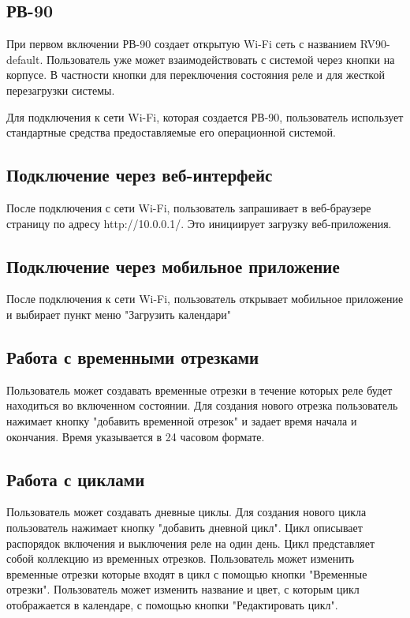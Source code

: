 \subsection{РВ-90}
При первом включении РВ-90 создает открытую Wi-Fi сеть  с названием RV90-default.
Пользователь уже может взаимодействовать с системой через кнопки на корпусе. В частности кнопки для переключения состояния реле и для жесткой перезагрузки системы.
 
Для подключения к сети Wi-Fi, которая создается РВ-90, пользователь использует стандартные средства предоставляемые его операционной системой.

\subsection{Подключение через веб-интерфейс}
После подключения с сети Wi-Fi, пользователь запрашивает в веб-браузере страницу по адресу http://10.0.0.1/. Это инициирует загрузку веб-приложения.

\subsection{Подключение через мобильное приложение}
После подключения к сети Wi-Fi, пользователь открывает мобильное приложение и выбирает пункт меню "Загрузить календари"

\subsection{Работа с временными отрезками}
Пользователь может создавать временные отрезки в течение которых реле будет находиться во включенном состоянии. Для создания нового отрезка пользователь нажимает кнопку "добавить временной отрезок" и задает время начала и окончания. Время указывается в 24 часовом формате. 


\subsection{Работа с циклами}
Пользователь может создавать дневные циклы. Для создания нового цикла пользователь нажимает кнопку "добавить дневной цикл". Цикл описывает распорядок включения и выключения реле на один день. Цикл представляет собой коллекцию из временных отрезков. Пользователь может изменить временные отрезки которые входят в цикл с помощью кнопки "Временные отрезки". Пользователь может изменить название и цвет, с которым цикл отображается в календаре, с помощью кнопки "Редактировать цикл".


